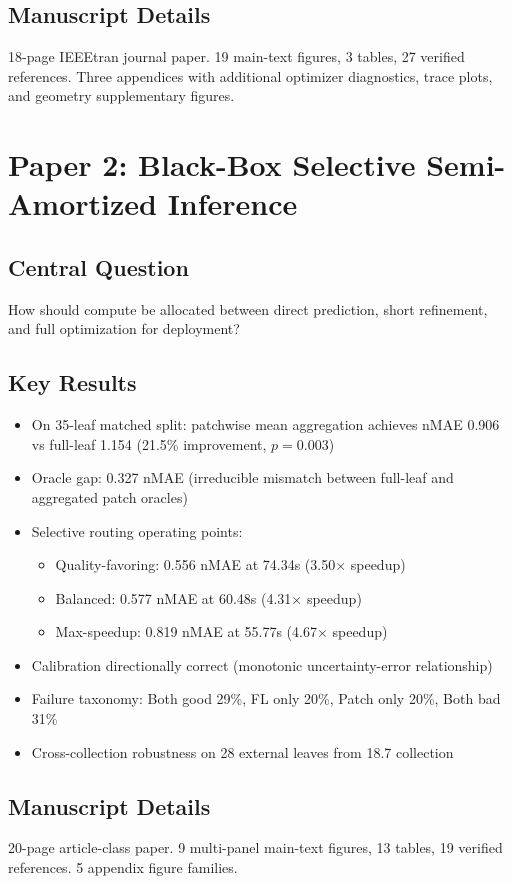 \documentclass[11pt,a4paper]{article}
\begin{document}
\subsection{Manuscript Details}
18-page IEEEtran journal paper. 19 main-text figures, 3 tables, 27 verified references. Three appendices with additional optimizer diagnostics, trace plots, and geometry supplementary figures.

\section{Paper 2: Black-Box Selective Semi-Amortized Inference}

\subsection{Central Question}
How should compute be allocated between direct prediction, short refinement, and full optimization for deployment?

\subsection{Key Results}
\begin{itemize}
\item On 35-leaf matched split: patchwise mean aggregation achieves nMAE 0.906 vs full-leaf 1.154 (21.5\% improvement, $p=0.003$)
\item Oracle gap: 0.327 nMAE (irreducible mismatch between full-leaf and aggregated patch oracles)
\item Selective routing operating points:
  \begin{itemize}
  \item Quality-favoring: 0.556 nMAE at 74.34s (3.50$\times$ speedup)
  \item Balanced: 0.577 nMAE at 60.48s (4.31$\times$ speedup)
  \item Max-speedup: 0.819 nMAE at 55.77s (4.67$\times$ speedup)
  \end{itemize}
\item Calibration directionally correct (monotonic uncertainty-error relationship)
\item Failure taxonomy: Both good 29\%, FL only 20\%, Patch only 20\%, Both bad 31\%
\item Cross-collection robustness on 28 external leaves from 18.7 collection
\end{itemize}

\subsection{Manuscript Details}
20-page article-class paper. 9 multi-panel main-text figures, 13 tables, 19 verified references. 5 appendix figure families.
\end{document}
